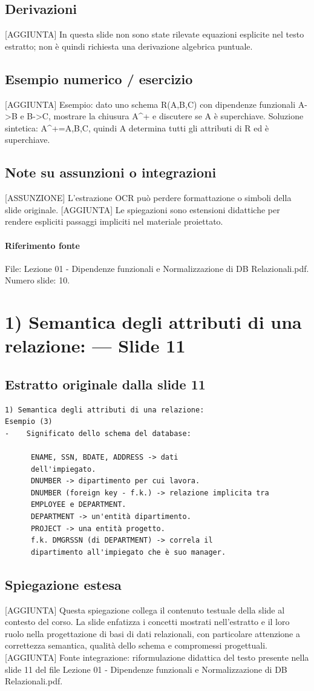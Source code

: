 \documentclass[11pt]{article}
\begin{document}
\subsection*{Derivazioni}
[AGGIUNTA] In questa slide non sono state rilevate equazioni esplicite nel testo estratto; non è quindi richiesta una derivazione algebrica puntuale.
\subsection*{Esempio numerico / esercizio}
[AGGIUNTA] Esempio: dato uno schema R(A,B,C) con dipendenze funzionali A->B e B->C, mostrare la chiusura A^+ e discutere se A è superchiave. Soluzione sintetica: A^+={A,B,C}, quindi A determina tutti gli attributi di R ed è superchiave.
\subsection*{Note su assunzioni o integrazioni}
[ASSUNZIONE] L'estrazione OCR può perdere formattazione o simboli della slide originale.
[AGGIUNTA] Le spiegazioni sono estensioni didattiche per rendere espliciti passaggi impliciti nel materiale proiettato.
\paragraph{Riferimento fonte} File: Lezione 01 - Dipendenze funzionali e Normalizzazione di DB Relazionali.pdf. Numero slide: 10.
\section{1) Semantica degli attributi di una relazione: --- Slide 11}
\subsection*{Estratto originale dalla slide 11}
\begin{lstlisting}
1) Semantica degli attributi di una relazione:
Esempio (3)
-    Significato dello schema del database:

      ENAME, SSN, BDATE, ADDRESS -> dati
      dell'impiegato.
      DNUMBER -> dipartimento per cui lavora.
      DNUMBER (foreign key - f.k.) -> relazione implicita tra
      EMPLOYEE e DEPARTMENT.
      DEPARTMENT -> un'entità dipartimento.
      PROJECT -> una entità progetto.
      f.k. DMGRSSN (di DEPARTMENT) -> correla il
      dipartimento all'impiegato che è suo manager.
\end{lstlisting}
\subsection*{Spiegazione estesa}
[AGGIUNTA] Questa spiegazione collega il contenuto testuale della slide al contesto del corso. La slide enfatizza i concetti mostrati nell'estratto e il loro ruolo nella progettazione di basi di dati relazionali, con particolare attenzione a correttezza semantica, qualità dello schema e compromessi progettuali.
[AGGIUNTA] Fonte integrazione: riformulazione didattica del testo presente nella slide 11 del file Lezione 01 - Dipendenze funzionali e Normalizzazione di DB Relazionali.pdf.
\end{document}
